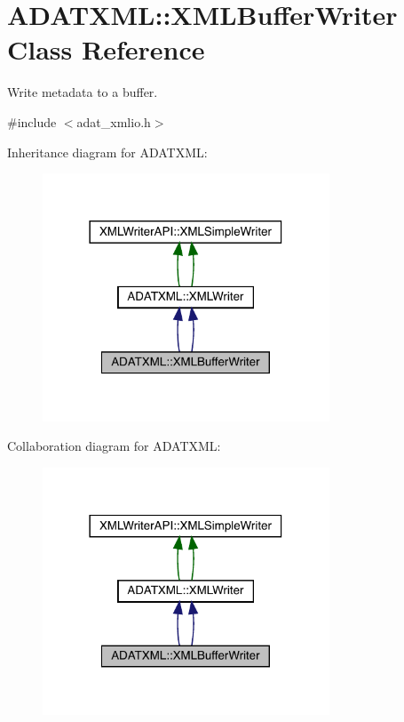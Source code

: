 \hypertarget{classADATXML_1_1XMLBufferWriter}{}\section{A\+D\+A\+T\+X\+ML\+:\+:X\+M\+L\+Buffer\+Writer Class Reference}
\label{classADATXML_1_1XMLBufferWriter}


Write metadata to a buffer.  




{\ttfamily \#include $<$adat\+\_\+xmlio.\+h$>$}



Inheritance diagram for A\+D\+A\+T\+X\+ML\+:\nopagebreak
\begin{figure}[H]
\begin{center}
\leavevmode
\includegraphics[width=242pt]{da/dc3/classADATXML_1_1XMLBufferWriter__inherit__graph}
\end{center}
\end{figure}


Collaboration diagram for A\+D\+A\+T\+X\+ML\+:\nopagebreak
\begin{figure}[H]
\begin{center}
\leavevmode
\includegraphics[width=242pt]{dc/d52/classADATXML_1_1XMLBufferWriter__coll__graph}
\end{center}
\end{figure}
